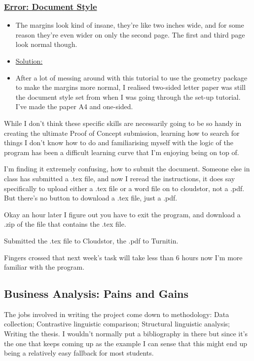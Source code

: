 \documentclass[12pt]{article}
\begin{document}
\subsubsection{\underline{Error: Document Style}}\label{error:er5}
\begin{itemize}
    \item The margins look kind of insane, they’re like two inches wide, and for some reason they’re even wider on only the second page. The first and third page look normal though.
\end{itemize}
\begin{itemize}
\renewcommand{\labelitemi}{$\nobullet$}
\item \underline{Solution:}
\renewcommand{\labelitemi}{$\bullet$}
    \item After a lot of messing around with this tutorial to use the geometry package to make the margins more normal, I realised two-sided letter paper was still the document style set from when I was going through the set-up tutorial. I’ve made the paper A4 and one-sided.
\end{itemize}

While I don’t think these specific skills are necessarily going to be so handy in creating the ultimate Proof of Concept submission, learning how to search for things I don’t know how to do and familiarising myself with the logic of the program has been a difficult learning curve that I’m enjoying being on top of.

I’m finding it extremely confusing, how to submit the document. Someone else in class has submitted a .tex file, and now I reread the instructions, it does say specifically to upload either a .tex file or a word file on to cloudstor, not a .pdf. But there’s no button to download a .tex file, just a .pdf.

Okay an hour later I figure out you have to exit the program, and download a .zip of the file that contains the .tex file. 

Submitted the .tex file to Cloudstor, the .pdf to Turnitin.

Fingers crossed that next week’s task will take less than 6 hours now I’m more familiar with the program.

\subsection{Business Analysis: Pains and Gains}
The jobs involved in writing the project come down to methodology: Data collection; Contrastive linguistic comparison; Structural linguistic analysis; Writing the thesis. I wouldn't normally put a bibliography in there but since it's the one that keeps coming up as the example I can sense that this might end up being a relatively easy fallback for most students.
\end{document}
